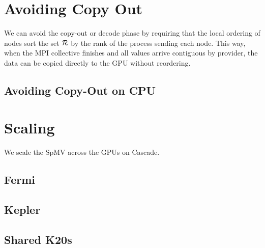 \documentclass{report}
\begin{document}
\section{Avoiding Copy Out}
We can avoid the copy-out or decode phase by requiring that the local ordering of nodes sort the set $\mathcal{R}$ by the rank of the process sending each node. This way, when the MPI collective finishes and all values arrive contiguous by provider, the data can be copied directly to the GPU without reordering.


\subsection{Avoiding Copy-Out on CPU}

\section{Scaling}
We scale the SpMV across the GPUs on Cascade.

\subsection{Fermi}
\subsection{Kepler}

\subsection{Shared K20s}


\ifstandalone


\end{document}
